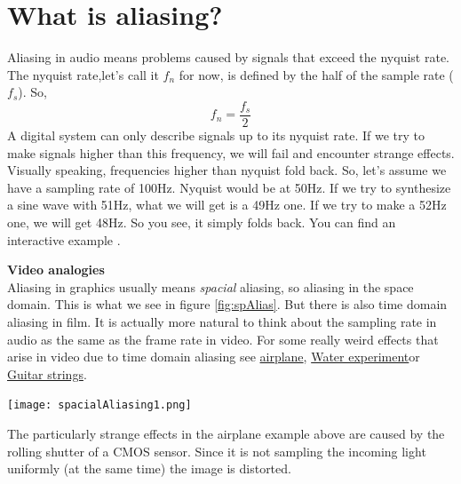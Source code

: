 \section{What is aliasing?}
Aliasing in audio means problems caused by signals that exceed the nyquist rate.\\
The nyquist rate,let's call it $f_n$ for now, is defined by the half of the sample rate ($f_s$). So,
\begin{equation}
	f_n=\frac{f_s}{2}
\end{equation}
A digital system can only describe signals up to its nyquist rate. If we try to make signals higher than this frequency, we will fail and encounter strange effects.\\
Visually speaking, frequencies higher than nyquist fold back. So, let's assume we have a sampling rate of 100Hz. Nyquist would be at 50Hz. If we try to synthesize a sine wave with 51Hz, what we will get is a 49Hz one. If we try to make a 52Hz one, we will get 48Hz. So you see, it simply folds back. You can find an interactive example .

\begin{framed}
	\textbf{Video analogies}\\
	Aliasing in graphics usually means \textit{spacial} aliasing, so aliasing in the space domain. This is what we see in figure \ref{fig:spAlias}. But there is also time domain aliasing in film. It is actually more natural to think about the sampling rate in audio as the same as the frame rate in video. For some really weird effects that arise in video due to time domain aliasing see \href{https://www.youtube.com/watch?v=LVwmtwZLG88}{airplane}\footnotemark , \href{https://www.youtube.com/watch?v=GBtHeR-hY9Y}{Water experiment}\footnotemark or \href{https://www.youtube.com/watch?v=jcOKTTnOIV8}{Guitar strings}\footnotemark .
	\begin{center}
		\texttt{[image: spacialAliasing1.png]}
		\label{fig:spAlias}
	\end{center}
	The particularly strange effects in the airplane example above are caused by the rolling shutter of a CMOS sensor. Since it is not sampling the incoming light uniformly (at the same time) the image is distorted.
\end{framed}



